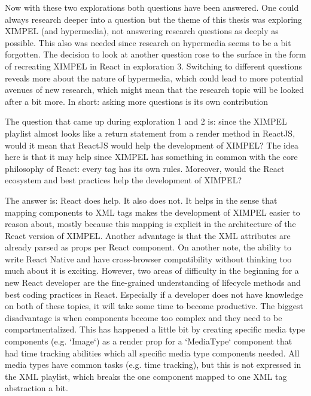 Now with these two explorations both questions have been answered. One could always research deeper into a question but the theme of this thesis was exploring XIMPEL (and hypermedia), not answering research questions as deeply as possible. This also was needed since research on hypermedia seems to be a bit forgotten. The decision to look at another question rose to the surface in the form of recreating XIMPEL in React in exploration 3. Switching to different questions reveals more about the nature of hypermedia, which could lead to more potential avenues of new research, which might mean that the research topic will be looked after a bit more. In short: asking more questions is its own contribution

The question that came up during exploration 1 and 2 is: since the XIMPEL playlist almost looks like a return statement from a render method in ReactJS, would it mean that ReactJS would help the development of XIMPEL? The idea here is that it may help since XIMPEL has something in common with the core philosophy of React: every tag has its own rules. Moreover, would the React ecosystem and best practices help the development of XIMPEL? 

The answer is: React does help. It also does not. It helps in the sense that mapping components to XML tags makes the development of XIMPEL easier to reason about, mostly because this mapping is explicit in the architecture of the React version of XIMPEL. Another advantage is that the XML attributes are already parsed as props per React component. On another note, the ability to write React Native and have cross-browser compatibility without thinking too much about it is exciting. However, two areas of difficulty in the beginning for a new React developer are the fine-grained understanding of lifecycle methods and best coding practices in React. Especially if a developer does not have knowledge on both of these topics, it will take some time to become productive. The biggest disadvantage is when components become too complex and they need to be compartmentalized. This has happened a little bit by creating specific media type components (e.g. `Image`) as a render prop for a `MediaType` component that had time tracking abilities which all specific media type components needed. All media types have common tasks (e.g. time tracking), but this is not expressed in the XML playlist, which breaks the one component mapped to one XML tag abstraction a bit.

